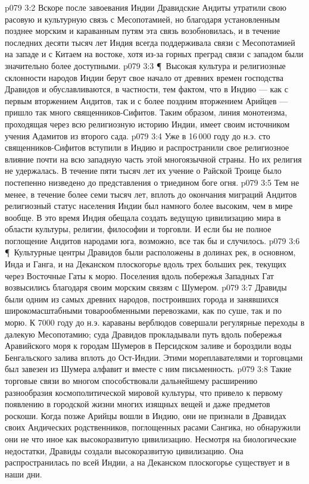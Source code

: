 \vs p079 3:2 Вскоре после завоевания Индии Дравидские Андиты утратили свою расовую и культурную связь с Месопотамией, но благодаря установленным позднее морским и караванным путям эта связь возобновилась, и в течение последних десяти тысяч лет Индия всегда поддерживала связи с Месопотамией на западе и с Китаем на востоке, хотя из\hyp{}за горных преград связи с западом были значительно более доступными.
\vs p079 3:3 \P\ Высокая культура и религиозные склонности народов Индии берут свое начало от древних времен господства Дравидов и обуславливаются, в частности, тем фактом, что в Индию --- как с первым вторжением Андитов, так и с более поздним вторжением Арийцев --- пришло так много священников\hyp{}Сифитов. Таким образом, линия монотеизма, проходящая через всю религиозную историю Индии, имеет своим источником учения Адамитов из второго сада.
\vs p079 3:4 Уже в 16\,000 году до н.э. сто священников\hyp{}Сифитов вступили в Индию и распространили свое религиозное влияние почти на всю западную часть этой многоязычной страны. Но их религия не удержалась. В течение пяти тысяч лет их учение о Райской Троице было постепенно низведено до представления о триедином боге огня.
\vs p079 3:5 Тем не менее, в течение более семи тысяч лет, вплоть до окончания миграций Андитов религиозный статус населения Индии был намного более высоким, чем в мире вообще. В это время Индия обещала создать ведущую цивилизацию мира в области культуры, религии, философии и торговли. И если бы не полное поглощение Андитов народами юга, возможно, все так бы и случилось.
\vs p079 3:6 \P\ Культурные центры Дравидов были расположены в долинах рек, в основном, Инда и Ганга, и на Деканском плоскогорье вдоль трех больших рек, текущих через Восточные Гаты к морю. Поселения вдоль побережья Западных Гат возвысились благодаря своим морским связям с Шумером.
\vs p079 3:7 Дравиды были одним из самых древних народов, построивших города и занявшихся широкомасштабными товарообменными перевозками, как по суше, так и по морю. К 7000 году до н.э. караваны верблюдов совершали регулярные переходы в далекую Месопотамию; суда Дравидов прокладывали путь вдоль побережья Аравийского моря к городам Шумеров в Персидском заливе и бороздили воды Бенгальского залива вплоть до Ост\hyp{}Индии. Этими мореплавателями и торговцами был завезен из Шумера алфавит и вместе с ним письменность.
\vs p079 3:8 Такие торговые связи во многом способствовали дальнейшему расширению разнообразия космополитической мировой культуры, что привело к первому появлению в городской жизни многих изящных вещей и даже предметов роскоши. Когда позже Арийцы вошли в Индию, они не признали в Дравидах своих Андических родственников, поглощенных расами Сангика, но обнаружили они не что иное как высокоразвитую цивилизацию. Несмотря на биологические недостатки, Дравиды создали высокоразвитую цивилизацию. Она распространилась по всей Индии, а на Деканском плоскогорье существует и в наши дни.
